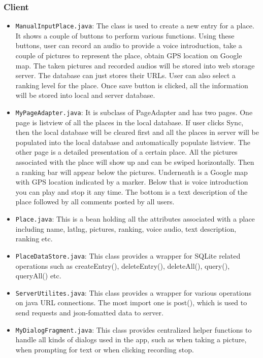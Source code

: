 \documentclass{article}
\begin{document}
\subsubsection{Client}

\begin{itemize}
\item 
\verb`ManualInputPlace.java`:
The class is used to create a new entry for a place. It shows a couple of buttons to perform various functions. Using these buttons, user can record an audio to provide a voice introduction, take a couple of pictures to represent the place, obtain GPS location on Google map. The taken pictures and recorded audios will be stored into web storage server. The database can just stores their URLs. User can also select a ranking level for the place. Once save button is clicked, all the information will be stored into local and server database.

\item
\verb`MyPageAdapter.java`:
It is subclass of PageAdapter and has two pages. One page is listview of all the places in the local database. If user clicks Sync, then the local database will be cleared first and all the places in server will be populated into the local database and automatically populate listview. The other page is a detailed presentation of a certain place. All the pictures associated with the place will show up and can be swiped horizontally. Then a ranking bar will appear below the pictures. Underneath is a Google map with GPS location indicated by a marker. Below that is voice introduction you can play and stop it any time. The bottom is a text description of the place followed by all comments posted by all users.

\item
\verb`Place.java`: 
This is a bean holding all the attributes associated with a place including name, latlng, pictures, ranking, voice audio, text description, ranking etc.

\item
\verb`PlaceDataStore.java`:
This class provides a wrapper for SQLite related operations such as createEntry(), deleteEntry(), deleteAll(), query(), queryAll() etc.

\item
\verb`ServerUtilites.java`:
This class provides a wrapper for various operations on java URL connections. The most import one is post(), which is used to send requests and json-fomatted data to server.

\item
\verb`MyDialogFragment.java`:
This class provides centralized helper functions to handle all kinds of dialogs used in the app, such as when taking a picture, when prompting for text or when clicking recording stop.


\end{itemize}
\end{document}
